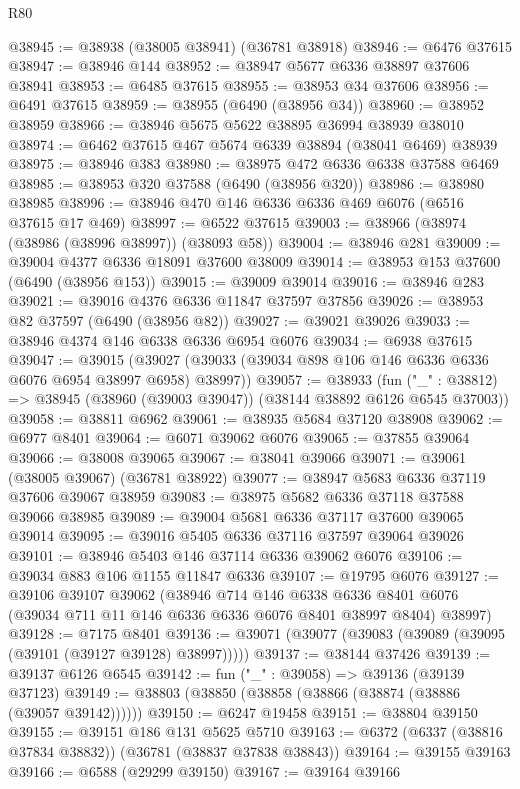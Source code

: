 \begin{lexlean}{R80}
\begin{coremodule}
@38945 := @38938 (@38005 @38941) (@36781 @38918)
@38946 := @6476 @37615
@38947 := @38946 @144
@38952 := @38947 @5677 @6336 @38897 @37606 @38941
@38953 := @6485 @37615
@38955 := @38953 @34 @37606
@38956 := @6491 @37615
@38959 := @38955 (@6490 (@38956 @34))
@38960 := @38952 @38959
@38966 := @38946 @5675 @5622 @38895 @36994 @38939 @38010
@38974 := @6462 @37615 @467 @5674 @6339 @38894 (@38041 @6469) @38939
@38975 := @38946 @383
@38980 := @38975 @472 @6336 @6338 @37588 @6469
@38985 := @38953 @320 @37588 (@6490 (@38956 @320))
@38986 := @38980 @38985
@38996 := @38946 @470 @146 @6336 @6336 @469 @6076 (@6516 @37615 @17 @469)
@38997 := @6522 @37615
@39003 := @38966 (@38974 (@38986 (@38996 @38997)) (@38093 @58))
@39004 := @38946 @281
@39009 := @39004 @4377 @6336 @18091 @37600 @38009
@39014 := @38953 @153 @37600 (@6490 (@38956 @153))
@39015 := @39009 @39014
@39016 := @38946 @283
@39021 := @39016 @4376 @6336 @11847 @37597 @37856
@39026 := @38953 @82 @37597 (@6490 (@38956 @82))
@39027 := @39021 @39026
@39033 := @38946 @4374 @146 @6338 @6336 @6954 @6076
@39034 := @6938 @37615
@39047 := @39015
    (@39027 (@39033 (@39034 @898 @106 @146 @6336 @6336 @6076 @6954 @38997 @6958) @38997))
@39057 := @38933
    (fun ("_" : @38812) => @38945 (@38960 (@39003 @39047)) (@38144 @38892 @6126 @6545 @37003))
@39058 := @38811 @6962
@39061 := @38935 @5684 @37120 @38908
@39062 := @6977 @8401
@39064 := @6071 @39062 @6076
@39065 := @37855 @39064
@39066 := @38008 @39065
@39067 := @38041 @39066
@39071 := @39061 (@38005 @39067) (@36781 @38922)
@39077 := @38947 @5683 @6336 @37119 @37606 @39067 @38959
@39083 := @38975 @5682 @6336 @37118 @37588 @39066 @38985
@39089 := @39004 @5681 @6336 @37117 @37600 @39065 @39014
@39095 := @39016 @5405 @6336 @37116 @37597 @39064 @39026
@39101 := @38946 @5403 @146 @37114 @6336 @39062 @6076
@39106 := @39034 @883 @106 @1155 @11847 @6336
@39107 := @19795 @6076
@39127 := @39106
    @39107
    @39062
    (@38946
      @714
      @146
      @6338
      @6336
      @8401
      @6076
      (@39034 @711 @11 @146 @6336 @6336 @6076 @8401 @38997 @8404)
      @38997)
@39128 := @7175 @8401
@39136 := @39071 (@39077 (@39083 (@39089 (@39095 (@39101 (@39127 @39128) @38997)))))
@39137 := @38144 @37426
@39139 := @39137 @6126 @6545
@39142 := fun ("_" : @39058) => @39136 (@39139 @37123)
@39149 := @38803 (@38850 (@38858 (@38866 (@38874 (@38886 (@39057 @39142))))))
@39150 := @6247 @19458
@39151 := @38804 @39150
@39155 := @39151 @186 @131 @5625 @5710
@39163 := @6372 (@6337 (@38816 @37834 @38832)) (@36781 (@38837 @37838 @38843))
@39164 := @39155 @39163
@39166 := @6588 (@29299 @39150)
@39167 := @39164 @39166

\end{coremodule}
\end{lexlean}

